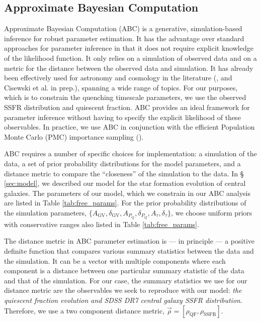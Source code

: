 \subsection{Approximate Bayesian Computation} \label{sec:abc}
Approximate Bayesian Computation (ABC) is a generative, 
simulation-based inference for robust parameter estimation. 
It has the advantage over standard approaches for parameter 
inference in that it does not require explicit knowledge 
of the likelihood function. It only relies on a simulation 
of observed data and on a metric for the distance between 
the observed data and simulation. It has already been 
effectively used for astronomy and cosmology in the literature 
(\citealt{Cameron:2012aa, Weyant:2013aa, Akeret:2015aa, 
Ishida:2015aa, Lin:2015aa, Lin:2016aa, Hahn:2016aa}, and 
Cisewski et al. in prep.), spanning a wide range of topics.
For our purposes, which is to constrain the quenching timescale 
parameters, we use the observed SSFR distribution and quiescent 
fraction. ABC provides an ideal framework for parameter inference 
without having to specify the explicit likelihood of these 
observables. In practice, we use 
ABC in conjunction with the efficient 
Population Monte Carlo (PMC) importance sampling 
(\citealt{Ishida:2015aa, Hahn:2016aa}). 

ABC requires a number of specific choices for implementation: a 
simulation of the data, a set of prior probability distributions 
for the model parameters, and a distance metric to compare the 
``closeness'' of the simulation to the data. In \S 
\ref{sec:model}, we described our model for the star formation 
evolution of central galaxies. The parameters of our model, which we 
constrain in our ABC analysis are listed in Table \ref{tab:free_params}. 
For the prior probability distributions of the simulation parameters, 
$\{A_\mathrm{GV}, \delta_\mathrm{GV}, A_{P_Q}, \delta_{P_Q}, A_\tau, 
\delta_\tau \}$, we choose uniform priors with conservative ranges also 
listed in Table \ref{tab:free_params}. 

The distance metric in ABC parameter estimation is --- in principle --- a
positive definite function that compares various 
summary statistics between the data and the simulation.
It can be a vector with multiple 
components where each component is a distance between one particular 
summary statistic of the data and that of the simulation. For our case, 
the summary statistics we use for our distance metric are the observables
we seek to reproduce with our model: {\em the quiescent fraction evolution and 
SDSS DR7 central galaxy SSFR distribution}. Therefore, we use a two component 
distance metric, $\vec\rho = [\rho_\mathrm{QF}, \rho_\mathrm{SSFR}]$. 

